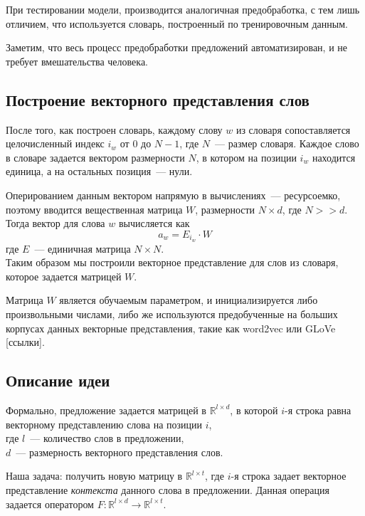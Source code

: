 При тестировании модели, производится аналогичная предобработка, 
с тем лишь отличием, что используется словарь, построенный по тренировочным данным.

Заметим, что весь процесс предобработки предложений автоматизирован, 
и не требует вмешательства человека.

\subsection{Построение векторного представления слов} \label{word_embedding}
После того, как построен словарь, каждому слову $w$ из словаря сопоставляется целочисленный индекс $i_w$ 
от $0$ до $N-1$, где $N$~--- размер словаря.
Каждое слово в словаре задается вектором размерности $N$, 
в котором на позиции $i_w$ находится единица, а на остальных позиция~--- нули.

Оперированием данным вектором напрямую в вычислениях~--- ресурсоемко, поэтому вводится вещественная матрица $W$, размерности $N \times d$, где $N >> d$.\\
Тогда вектор для слова $w$ вычисляется как
$$a_w = E_{i_w} \cdot W$$
где $E$~--- единичная матрица $N \times N$.\\
Таким образом мы построили векторное представление для слов из словаря, которое задается матрицей $W$.

Матрица $W$ является обучаемым параметром, и инициализируется либо произвольными числами, 
либо же используются предобученные на больших корпусах данных векторные представления, 
такие как word2vec или GLoVe [ссылки].

\subsection{Описание идеи } \label{loc_context}

Формально, предложение задается матрицей в  $\mathbb{R}^{l \times{} d}$, в которой $i$-я строка равна векторному представлению слова на позиции $i$,\\
где $l$~--- количество слов в предложении,\\
$d$~--- размерность векторного представления слов. 

Наша задача: получить новую матрицу в $\mathbb{R}^{l \times {} t}$, где $i$-я строка задает векторное представление \textit{контекста} данного слова в предложении. 
Данная операция задается оператором $F:\mathbb{R}^{l \times d} \to \mathbb{R}^{l \times t}$.

